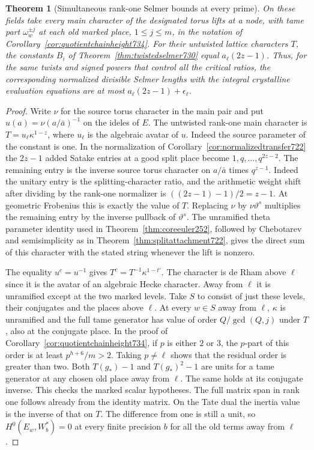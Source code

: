 \documentclass[a4paper,11pt]{article}
\newtheorem{theorem}[proposition]{Theorem}
\theoremstyle{definition}
\theoremstyle{remark}
\numberwithin{equation}{section}
\begin{document}
\begin{theorem}[Simultaneous rank-one Selmer bounds at every prime]
\leavevmode\label{thm:rankoneselmer737}
On these fields take every main character of the designated torus
lifts at a node, with tame part \(\omega_w^{\pm j}\) at each old
marked place, \(1\le j\le m\), in the notation of
Corollary~\ref{cor:quotientchainheight734}. For their untwisted
lattice characters \(T\), the constants \(B_i\) of
Theorem~\ref{thm:twistedselmer730} equal \(a_\ell(2z-1)\).
Thus, for the same twists and signed powers that control all the
critical ratios, the corresponding normalized divisible Selmer
lengths with the integral crystalline evaluation equations are
at most \(a_\ell(2z-1)+\epsilon_\ell\).
\end{theorem}
\begin{proof}
Write \(\nu\) for the source torus character in the main pair and
put \(u(a)=\nu(a/\bar a)^{-1}\) on the ideles of \(E\). The
untwisted rank-one main character is
\(T=u_\ell\kappa^{1-z}\), where \(u_\ell\) is the algebraic
avatar of \(u\). Indeed the source parameter of the constant is
one. In the normalization of Corollary~\ref{cor:normalizedtransfer722}
the \(2z-1\) added Satake entries at a good split place become
\(1,q,\ldots,q^{2z-2}\). The remaining entry is the inverse
source torus character on \(a/\bar a\) times \(q^{z-1}\).
Indeed the unitary entry is the splitting-character ratio, and the
arithmetic weight shift after dividing by the rank-one normalizer
is \(((2z-1)-1)/2=z-1\). At geometric Frobenius this is exactly
the value of \(T\). Replacing \(\nu\) by \(\nu\vartheta^s\)
multiplies the remaining entry by the inverse pullback of
\(\vartheta^s\). The unramified theta parameter identity used in
Theorem~\ref{thm:coreeuler252}, followed by Chebotarev and
semisimplicity as in Theorem~\ref{thm:splitattachment722}, gives
the direct sum of this character with the stated string whenever
the lift is nonzero.

The equality \(u^c=u^{-1}\) gives \(T^c=T^{-1}\kappa^{1-t'}\).
The character is de Rham above \(\ell\) since it is the avatar
of an algebraic Hecke character. Away from \(\ell\) it is
unramified except at the two marked levels. Take \(S\) to
consist of just these levels, their conjugates and the places
above \(\ell\). At every \(w\in S\) away from \(\ell\),
\(\kappa\) is unramified and the full tame generator has value
of order \(Q/\gcd(Q,j)\) under \(T\), also at the conjugate
place. In the proof of Corollary~\ref{cor:quotientchainheight734},
if \(p\) is either \(2\) or \(3\), the \(p\)-part of this order
is at least \(p^{h+6}/m>2\). Taking \(p\ne\ell\) shows that
the residual order is greater than two. Both \(T(g_*)-1\) and
\(T(g_*)^2-1\) are units for a tame generator at any chosen
old place away from \(\ell\). The same holds at its conjugate
inverse. This checks the marked scalar hypotheses. The full
matrix span in rank one follows already from the identity matrix.
On the Tate dual the inertia value is the inverse of that on
\(T\). The difference from one is still a unit, so
\(H^0(E_w,W_b^*)=0\) at every finite precision \(b\) for all the
old terms away from \(\ell\).


\end{proof}
\end{document}
